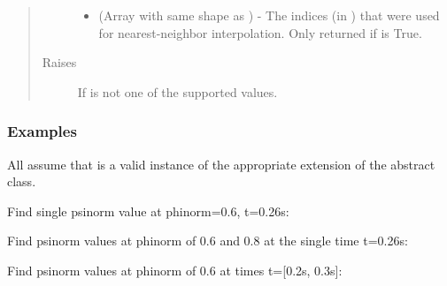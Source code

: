 \documentclass[letterpaper,10pt,english]{sphinxmanual}
\begin{document}
\begin{fulllineitems}
\begin{fulllineitems}
\begin{quote}
\begin{description}
\begin{itemize}
\item {} 
 (Array with same shape as ) - The indices
(in ) that were used for
nearest-neighbor interpolation. Only returned if  is
True.

\end{itemize}


\item[{Raises}] \leavevmode
{} \textendash{} If  is not one of the supported values.

\end{description}\end{quote}
\subsubsection*{Examples}

All assume that  is a valid instance of the appropriate
extension of the {\hyperref[\detokenize{eqtools:eqtools.core.Equilibrium}]{}} abstract class.

Find single psinorm value at phinorm=0.6, t=0.26s:

\begin{sphinxVerbatim}[commandchars=\\\{\}]
    
\end{sphinxVerbatim}

Find psinorm values at phinorm of 0.6 and 0.8 at the
single time t=0.26s:

\begin{sphinxVerbatim}[commandchars=\\\{\}]
   \PYG{p}{[} \PYG{p}{]} 
\end{sphinxVerbatim}

Find psinorm values at phinorm of 0.6 at times t={[}0.2s, 0.3s{]}:

\begin{sphinxVerbatim}[commandchars=\\\{\}]
    \PYG{p}{[} \PYG{p}{]}
\end{sphinxVerbatim}


\end{fulllineitems}
\end{fulllineitems}
\end{document}
